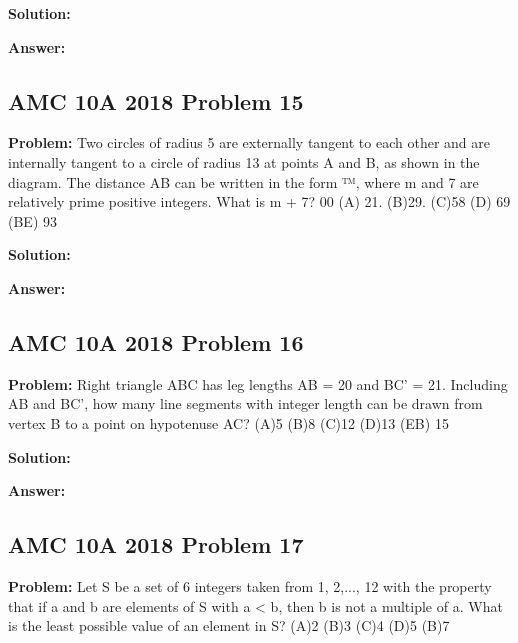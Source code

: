 \documentclass{article}
\newenvironment{problem}{\textbf{Problem: }}{\\}
\newenvironment{solution}{\textbf{Solution: }}{\\}
\newenvironment{answer}{\textbf{Answer: }}{\\}
\begin{document}
\begin{solution}
\end{solution}

\begin{answer}
\end{answer}

\subsection{AMC 10A 2018 Problem 15}

\begin{problem}
Two circles of radius 5 are externally tangent to each other and are internally tangent to a circle of radius 13 at points A and B, as shown in the diagram. The distance AB can be written in the form ™, where m and 7 are relatively prime positive integers. What is m + 7? 00 (A) 21. (B)29. (C)58 (D) 69 (BE) 93
\end{problem}

\begin{solution}
\end{solution}

\begin{answer}
\end{answer}

\subsection{AMC 10A 2018 Problem 16}

\begin{problem}
Right triangle ABC has leg lengths AB = 20 and BC’ = 21. Including AB and BC’, how many line segments with integer length can be drawn from vertex B to a point on hypotenuse AC? (A)5 (B)8 (C)12 (D)13 (EB) 15
\end{problem}

\begin{solution}
\end{solution}

\begin{answer}
\end{answer}

\subsection{AMC 10A 2018 Problem 17}

\begin{problem}
Let S be a set of 6 integers taken from {1, 2,..., 12} with the property that if a and b are elements of S with a < b, then b is not a multiple of a. What is the least possible value of an element in S? (A)2 (B)3 (C)4 (D)5 (B)7
\end{problem}
\end{document}
